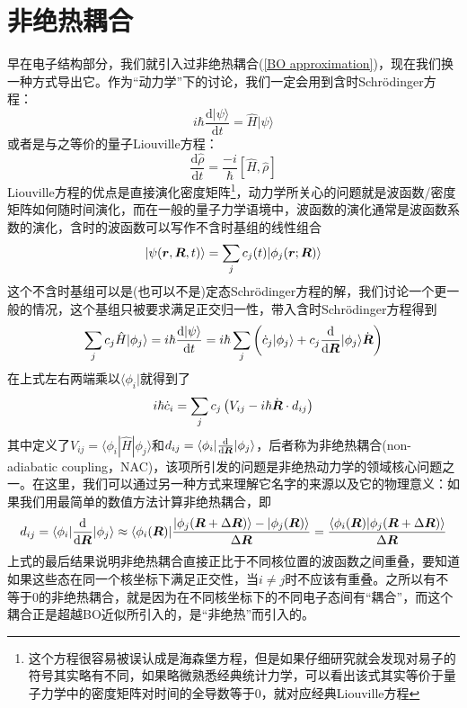 \documentclass[12pt,a4paper,openany,twoside]{book}
\numberwithin{equation}{section}
\newcommand{\sch}{Schr\"odinger}
\newcommand{\ud}{\mathrm{d}}
\begin{document}
      \section{非绝热耦合}
        早在电子结构部分，我们就引入过非绝热耦合(\ref{BO approximation})，现在我们换一种方式导出它。作为“动力学”下的讨论，我们一定会用到含时\sch 方程：
        \begin{equation}
          i \hbar \frac{\ud | \psi \rangle}{\ud t}=\hat{H} | \psi \rangle
        \end{equation}
        或者是与之等价的量子Liouville方程：
        \begin{equation}
          \frac{\ud \hat{\rho}}{\ud t}=\frac{-i}{\hbar}[\hat{H}, \hat{\rho}]
        \end{equation}
        Liouville方程的优点是直接演化密度矩阵\footnote{这个方程很容易被误认成是海森堡方程，但是如果仔细研究就会发现对易子的符号其实略有不同，如果略微熟悉经典统计力学，可以看出该式其实等价于量子力学中的密度矩阵对时间的全导数等于0，就对应经典Liouville方程}，动力学所关心的问题就是波函数/密度矩阵如何随时间演化，而在一般的量子力学语境中，波函数的演化通常是波函数系数的演化，含时的波函数可以写作不含时基组的线性组合
        \begin{equation}
          |\psi(\vb*{r}, \vb*{R}, t)\rangle=\sum_{j} c_{j}(t) |\phi_{j}(\vb*{r} ; \vb*{R})\rangle
          \label{linear combination}
        \end{equation}
        这个不含时基组可以是(也可以不是)定态\sch 方程的解，我们讨论一个更一般的情况，这个基组只被要求满足正交归一性，带入含时\sch 方程得到
        \begin{equation}
          \sum_j c_j \hat{H}|\phi_j\rangle=i \hbar \frac{\ud | \psi \rangle}{\ud t}=i \hbar\sum_j\left(\dot{c}_j|\phi_j\rangle+c_j\frac{\ud }{\ud \vb*{R}}|\phi_j\rangle\dot{\vb*{R}}\right)
        \end{equation}
        在上式左右两端乘以$\langle\phi_i|$就得到了
        \begin{equation}
          i \hbar \dot{c}_{i}=\sum_{j} c_{j}\left(V_{i j}-i \hbar \dot{\vb*{R}} \cdot d_{i j}\right)
          \label{time-depend-coeff}
        \end{equation}
        其中定义了$V_{ij}=\langle\phi_i|\hat{H}|\phi_j\rangle$和$d_{ij}=\langle\phi_i|\frac{\ud }{\ud \vb*{R}}|\phi_j\rangle$，后者称为非绝热耦合(non-adiabatic coupling，NAC)，该项所引发的问题是非绝热动力学的领域核心问题之一。在这里，我们可以通过另一种方式来理解它名字的来源以及它的物理意义：如果我们用最简单的数值方法计算非绝热耦合，即
        \begin{equation}
          d_{ij}=\langle\phi_i|\frac{\ud }{\ud \vb*{R}}|\phi_j\rangle\approx\langle\phi_i(\vb*{R})|\frac{|\phi_j(\vb*{R}+\Delta\vb*{R})\rangle-|\phi_j(\vb*{R})\rangle}{\Delta\vb*{R}}
          =\frac{\langle\phi_i(\vb*{R})|\phi_j(\vb*{R}+\Delta\vb*{R})\rangle}{\Delta\vb*{R}}
          \label{numerical dij}
        \end{equation}
        上式的最后结果说明非绝热耦合直接正比于不同核位置的波函数之间重叠，要知道如果这些态在同一个核坐标下满足正交性，当$i\neq j$时不应该有重叠。之所以有不等于0的非绝热耦合，就是因为在不同核坐标下的不同电子态间有“耦合”，而这个耦合正是超越BO近似所引入的，是“非绝热”而引入的。
\end{document}
